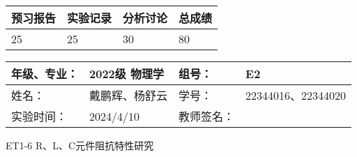 \documentclass[dvipsnames, svgnames,a4paper,11pt]{article}
\begin{document}
	
	
	
	
	\begin{table}
		\renewcommand\arraystretch{1.7}
		\begin{tabularx}{\textwidth}{
				|X|X|X|X
				|X|X|X|X|}
			\hline
			\multicolumn{2}{|c|}{预习报告}&\multicolumn{2}{|c|}{实验记录}&\multicolumn{2}{|c|}{分析讨论}&\multicolumn{2}{|c|}{总成绩}\\
			\hline
			\LARGE25 & & \LARGE25 & & \LARGE30 & & \LARGE80 & \\
			\hline
		\end{tabularx}
	\end{table}
	
	\begin{table}
		\renewcommand\arraystretch{1.7}
		\begin{tabularx}{\textwidth}{|X|X|X|X|}
			\hline
			年级、专业： & 2022级 物理学 &组号： & E2\\
			\hline
			姓名： & 戴鹏辉、杨舒云  & 学号： & 22344016、22344020\\
			\hline
			实验时间： & 2024/4/10 & 教师签名： & \\
			\hline
		\end{tabularx}
	\end{table}
	
	\begin{center}
		\LARGE ET1-6 \quad R、L、C元件阻抗特性研究
	\end{center}
	
	
\end{document}
